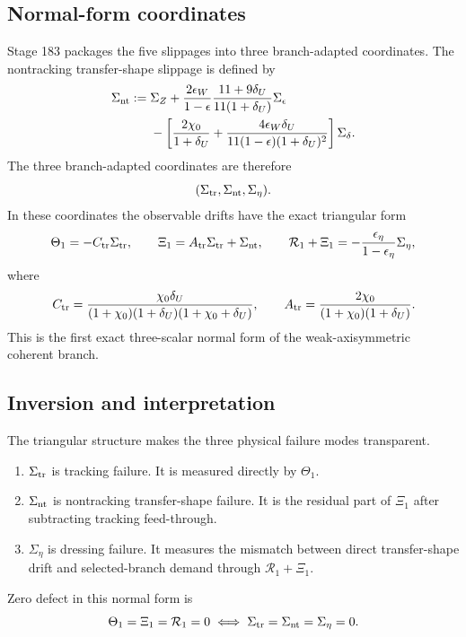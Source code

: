 \subsection{Normal-form coordinates}
Stage 183 packages the five slippages into three branch-adapted coordinates.  The nontracking transfer-shape slippage is defined by
\begin{equation}
\label{eq:app-part05-Sigma-nt-def}
\begin{aligned}
\Sigma_{\rm nt}:={}&
\Sigma_Z
+
\frac{2\epsilon_W}{1-\epsilon}\frac{11+9\delta_U}{11(1+\delta_U)}\Sigma_\epsilon \\
&-
\left[
\frac{2\chi_0}{1+\delta_U}
+
\frac{4\epsilon_W\delta_U}{11(1-\epsilon)(1+\delta_U)^2}
\right]\Sigma_\delta.
\end{aligned}
\end{equation}
The three branch-adapted coordinates are therefore
\begin{equation}
\label{eq:app-part05-normal-form-coordinates}
(\Sigma_{\rm tr},\Sigma_{\rm nt},\Sigma_\eta).
\end{equation}
In these coordinates the observable drifts have the exact triangular form
\begin{equation}
\label{eq:app-part05-triangular-normal-form}
\Theta_1=-C_{\rm tr}\Sigma_{\rm tr},
\qquad
\Xi_1=A_{\rm tr}\Sigma_{\rm tr}+\Sigma_{\rm nt},
\qquad
\mathcal R_1+\Xi_1=-\frac{\epsilon_\eta}{1-\epsilon_\eta}\Sigma_\eta,
\end{equation}
where
\begin{equation}
\label{eq:app-part05-Ctr-Atr-defs}
C_{\rm tr}
=
\frac{\chi_0\delta_U}{(1+\chi_0)(1+\delta_U)(1+\chi_0+\delta_U)},
\qquad
A_{\rm tr}
=
\frac{2\chi_0}{(1+\chi_0)(1+\delta_U)}.
\end{equation}
This is the first exact three-scalar normal form of the weak-axisymmetric coherent branch.

\subsection{Inversion and interpretation}
The triangular structure makes the three physical failure modes transparent.
\begin{enumerate}[leftmargin=2.2em]
  \item \(\Sigma_{\rm tr}\) is tracking failure.  It is measured directly by \(\Theta_1\).
  \item \(\Sigma_{\rm nt}\) is nontracking transfer-shape failure.  It is the residual part of \(\Xi_1\) after subtracting tracking feed-through.
  \item \(\Sigma_\eta\) is dressing failure.  It measures the mismatch between direct transfer-shape drift and selected-branch demand through \(\mathcal R_1+\Xi_1\).
\end{enumerate}
Zero defect in this normal form is
\begin{equation}
\label{eq:app-part05-zero-normal-form}
\Theta_1=\Xi_1=\mathcal R_1=0
\iff
\Sigma_{\rm tr}=\Sigma_{\rm nt}=\Sigma_\eta=0.
\end{equation}

